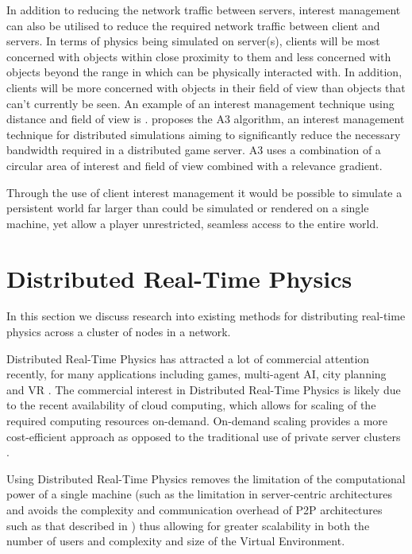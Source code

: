 In addition to reducing the network traffic between servers, interest management can also be utilised to reduce the required network traffic between client and servers. In terms of physics being simulated on server(s), clients will be most concerned with objects within close proximity to them and less concerned with objects beyond the range in which can be physically interacted with. In addition, clients will be more concerned with objects in their field of view than objects that can't currently be seen. An example of an interest management technique using distance and field of view is \cite{Bezerra2008}. \cite{Bezerra2008} proposes the A3 algorithm, an interest management technique for distributed simulations aiming to significantly reduce the necessary bandwidth required in a distributed game server. A3 uses a combination of a circular area of interest and field of view combined with a relevance gradient.

Through the use of client interest management it would be possible to simulate a persistent world far larger than could be simulated or rendered on a single machine, yet allow a player unrestricted, seamless access to the entire world.


\section{Distributed Real-Time Physics}

In this section we discuss research into existing methods for distributing real-time physics across a cluster of nodes in a network.

Distributed Real-Time Physics has attracted a lot of commercial attention recently, for many applications including games, multi-agent AI, city planning and VR \cite{SpatialOS}. The commercial interest in Distributed Real-Time Physics is likely due to the recent availability of cloud computing, which allows for scaling of the required computing resources on-demand. On-demand scaling provides a more cost-efficient approach as opposed to the traditional use of private server clusters \cite{On-DemandResourceMMOGs}.

Using Distributed Real-Time Physics removes the limitation of the computational power of a single machine (such as the limitation in server-centric architectures \cite{ScalabilityforVirtualWorlds} and avoids the complexity and communication overhead of P2P architectures such as that described in \cite{VON}) thus allowing for greater scalability in both the number of users \cite{ScalabilityIssues} and complexity and size of the Virtual Environment. 

